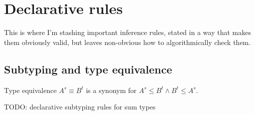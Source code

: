 \documentclass{rntz}
\newcommand{\todo}[1]{{\color{Rhodamine}#1}}
\newcommand{\GG}{\Gamma}
\newcommand{\x}{\times}
\begin{document}







\section{Declarative rules}

\todo{This is where I'm stashing important inference rules, stated in a way that
  makes them obviously valid, but leaves non-obvious how to algorithmically
  check them.}

\subsection{Subtyping and type equivalence}
Type equivalence $A^s \equiv B^t$ is a synonym for $A^s \le B^t \wedge B^t \le
A^s$.

\todo{TODO: declarative subtyping rules for sum types}
\end{document}
